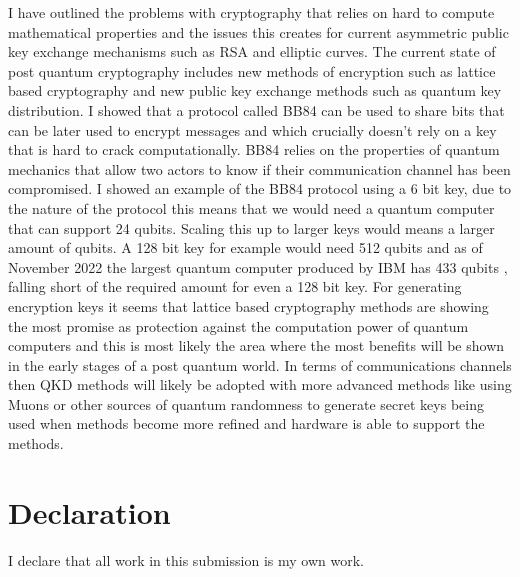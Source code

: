 \documentclass{article}
\begin{document}
I have outlined the problems with cryptography that relies on hard to compute mathematical properties and the issues this creates for current asymmetric public key exchange mechanisms such as RSA and elliptic curves. The current state of post quantum cryptography includes new methods of encryption such as lattice based cryptography and new public key exchange methods such as quantum key distribution. I showed that a protocol called BB84 can be used to share bits that can be later used to encrypt messages and which crucially doesn't rely on a key that is hard to crack computationally. BB84 relies on the properties of quantum mechanics that allow two actors to know if their communication channel has been compromised. I showed an example of the BB84 protocol using a 6 bit key, due to the nature of the protocol this means that we would need a quantum computer that can support 24 qubits. Scaling this up to larger keys would means a larger amount of qubits. A 128 bit key for example would need 512 qubits and as of November 2022 the largest quantum computer produced by IBM has 433 qubits \cite{2022IBMScientist}, falling short of the required amount for even a 128 bit key.
For generating encryption keys it seems that lattice based cryptography methods are showing the most promise as protection against the computation power of quantum computers and this is most likely the area where the most benefits will be shown in the early stages of a post quantum world. 
In terms of communications channels then QKD methods will likely be adopted with more advanced methods like using Muons or other sources of quantum randomness to generate secret keys being used when methods become more refined and hardware is able to support the methods.


\printbibliography

\section{Declaration}
I declare that all work in this submission is my own work.
\end{document}
